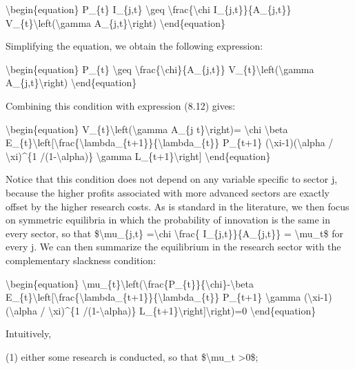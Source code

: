 \documentclass[10pt,math=newtx,citestyle=gb7714-2015,bibstyle=gb7714-2015]{elegantbook}
\begin{document}
	\textbackslash{}begin\{equation\}
	P\_\{t\} I\_\{j,t\} \textbackslash{}geq \textbackslash{}frac\{\textbackslash{}chi I\_\{j,t\}\}\{A\_\{j,t\}\} V\_\{t\}\textbackslash{}left(\textbackslash{}gamma A\_\{j,t\}\textbackslash{}right)
	\textbackslash{}end\{equation\}
	
	Simplifying the equation, we obtain the following expression: 
	
	\textbackslash{}begin\{equation\}
	P\_\{t\}  \textbackslash{}geq \textbackslash{}frac\{\textbackslash{}chi\}\{A\_\{j,t\}\} V\_\{t\}\textbackslash{}left(\textbackslash{}gamma A\_\{j,t\}\textbackslash{}right)
	\textbackslash{}end\{equation\}
	
	Combining this condition with expression (8.12) gives:
	
	\textbackslash{}begin\{equation\}
	V\_\{t\}\textbackslash{}left(\textbackslash{}gamma A\_\{j t\}\textbackslash{}right)= \textbackslash{}chi \textbackslash{}beta E\_\{t\}\textbackslash{}left[\textbackslash{}frac\{\textbackslash{}lambda\_\{t+1\}\}\{\textbackslash{}lambda\_\{t\}\} P\_\{t+1\} (\textbackslash{}xi-1)(\textbackslash{}alpha / \textbackslash{}xi)\^{}\{1 /(1-\textbackslash{}alpha)\} \textbackslash{}gamma L\_\{t+1\}\textbackslash{}right]
	\textbackslash{}end\{equation\}
	
	Notice that this condition does not depend on any variable specific to sector j, because the higher profits associated with more advanced sectors are exactly offset by the higher research costs. As is standard in the literature, we then focus on symmetric equilibria in which the probability of innovation is the same in every sector, so that \$\textbackslash{}mu\_\{j,t\} =\textbackslash{}chi \textbackslash{}frac\{ I\_\{j,t\}\}\{A\_\{j,t\}\} = \textbackslash{}mu\_t\$ for every j. We can then summarize the equilibrium in the research sector with the complementary slackness condition:
	
	\textbackslash{}begin\{equation\}
	\textbackslash{}mu\_\{t\}\textbackslash{}left(\textbackslash{}frac\{P\_\{t\}\}\{\textbackslash{}chi\}-\textbackslash{}beta E\_\{t\}\textbackslash{}left[\textbackslash{}frac\{\textbackslash{}lambda\_\{t+1\}\}\{\textbackslash{}lambda\_\{t\}\} P\_\{t+1\} \textbackslash{}gamma (\textbackslash{}xi-1)(\textbackslash{}alpha / \textbackslash{}xi)\^{}\{1 /(1-\textbackslash{}alpha)\} L\_\{t+1\}\textbackslash{}right]\textbackslash{}right)=0
	\textbackslash{}end\{equation\}
	
	Intuitively, 
	
	(1) either some research is conducted, so that \$\textbackslash{}mu\_t >0\$;
	
\end{document}

